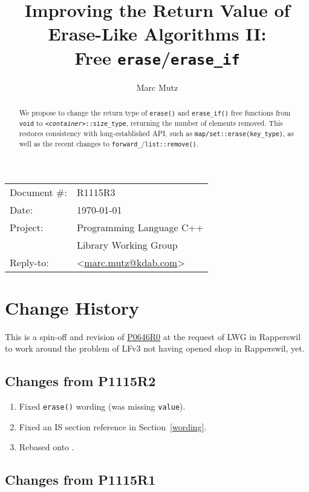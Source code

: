 \documentclass[11pt]{article}
\date{}
\title{Improving the Return Value of Erase-Like Algorithms II:\\ Free
  \texttt{erase}/\texttt{erase\_if}}
\makeatletter
\newcommand{\emailaddress}{marc.mutz@kdab.com}
\newcommand{\email}{\href{mailto:\emailaddress}{\emailaddress}}
\newcommand{\wgpaper}[1]{\href{https://wg21.link/#1}{#1}}
\newcommand{\cst}{\texttt{\textit{<container>}::size\_type}}
\makeatother
\begin{document}
\maketitle\vspace{-2cm}

\begin{tabular}{ll}
  Document \#:&R1115R3\\
  Date:       &\today\\
  Project:    &Programming Language C++\\
              &Library Working Group\\
  Reply-to:   &\author{Marc Mutz} \textless\email\textgreater
\end{tabular}
\vspace{1cm}
\begin{abstract}
  We propose to change the return type of \texttt{erase()} and
  \texttt{erase\_if()} free functions from \texttt{void} to \cst,
  returning the number of elements removed. This restores consistency
  with long-established API, such as
  \texttt{map/set::erase(key\_type)}, as well as the recent changes to
  \texttt{forward\_}/\texttt{list::remove()}.
\end{abstract}


\tableofcontents

\section{Change History}

This is a spin-off and revision of \wgpaper{P0646R0} at the request of
LWG in Rapperswil to work around the problem of LFv3 not having opened
shop in Rapperswil, yet.

\subsection{Changes from P1115R2}

\begin{enumerate}
\item Fixed \texttt{erase()} wording (was missing \texttt{value}).
\item Fixed an IS section reference in Section~\ref{wording}.
\item Rebased onto \cite{N4835}.
\end{enumerate}

\subsection{Changes from P1115R1}
\end{document}
